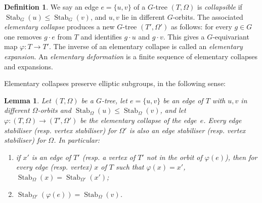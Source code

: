 \documentclass[svgnames]{amsart}
\theoremstyle{plain}
\newtheorem{lemma}[thm]{Lemma}
\theoremstyle{definition}
\newtheorem{defn}[thm]{Definition}
\newcommand{\Stab}[2]{\operatorname{Stab}_{#1}\left(#2\right)}
\renewcommand{\phi}{\varphi}
\begin{document}
\begin{defn}\label{def:elementarycollapse}
    We say an edge $e=\{u,v\}$ of a $G$-tree $(T,\Omega)$ is \emph{collapsible} if $\Stab{G}{u} \le \Stab{G}{v}$, and $u,v$ lie in different $G$-orbits. The associated \emph{elementary collapse} produces a new $G$-tree $(T', \Omega')$ as follows: for every $g\in G$ one removes $g\cdot e$ from $T$ and identifies $g\cdot u$ and $g\cdot v$. This gives a $G$-equivariant map $\phi\colon T\to T'$. The inverse of an elementary collapse is called an \emph{elementary expansion}. An \emph{elementary deformation} is a finite sequence of elementary collapses and expansions. 
\end{defn}



\noindent Elementary collapses preserve elliptic subgroups, in the following sense:
\begin{lemma}
    \label{lem:stabsOfCollapse}
    Let $(T,\Omega)$ be a $G$-tree, let $e=\{u,v\}$ be an edge of $T$ with $u,v$ in different $\Omega$-orbits and $\Stab \Omega u\le\Stab\Omega v$, and let $\phi\colon(T,\Omega)\to(T',\Omega')$ be the elementary collapse of the edge~$e$. Every edge stabiliser (resp. vertex stabiliser) for $\Omega'$ is also an edge stabiliser (resp. vertex stabiliser) for $\Omega$.
     In particular:
    \begin{enumerate}
        \item if $x'$ is an edge of $T'$ (resp. a vertex of $T'$ not in the orbit of $\phi(e)$), then for every edge (resp. vertex) $x$ of $T$ such that $\phi(x) = x'$, $\Stab\Omega x=\Stab{\Omega'}{x'}$;
        \item $\Stab{\Omega'}{\phi(e)}=\Stab\Omega v$.
    \end{enumerate}
\end{lemma}
\end{document}
